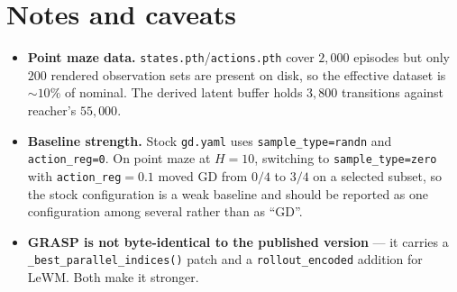 \documentclass[11pt]{article}
\begin{document}
\section{Notes and caveats}
\begin{itemize}
  \item \textbf{Point maze data.} \texttt{states.pth}/\texttt{actions.pth}
        cover $2{,}000$ episodes but only $200$ rendered observation sets are
        present on disk, so the effective dataset is ${\sim}10\%$ of nominal.
        The derived latent buffer holds $3{,}800$ transitions against
        reacher's $55{,}000$.
  \item \textbf{Baseline strength.} Stock \texttt{gd.yaml} uses
        \texttt{sample\_type=randn} and \texttt{action\_reg=0}. On point maze
        at $H{=}10$, switching to \texttt{sample\_type=zero} with
        \texttt{action\_reg}$=0.1$ moved GD from $0/4$ to $3/4$ on a selected
        subset, so the stock configuration is a weak baseline and should be
        reported as one configuration among several rather than as ``GD''.
  \item \textbf{GRASP is not byte-identical to the published version} --- it
        carries a \texttt{\_best\_parallel\_indices()} patch and a
        \texttt{rollout\_encoded} addition for LeWM. Both make it stronger.
\end{itemize}
\end{document}

